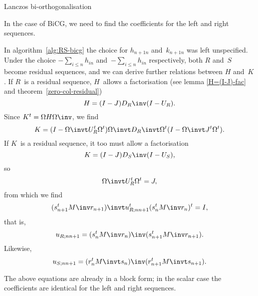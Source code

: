 \documentclass[11pt]{artikel3}
\begin{document}
\begin{Outline}
\begin{comment}
\begin{comment}
\begin{eqnarray*}
S^tP(I- U)=S^tM\inv R&\Rightarrow&
    \hbox{$S^tP$ is upper triangular}\\
    &\hbox{and}&s_i^tp_i=s_i^tM\inv r_i
    \end{eqnarray*}
Using the fact that $S^tP$ is upper triangular we find:
\begin{eqnarray*}
P^tA^tQ D=P^tS(I-J)&\Rightarrow&
    \hbox{$P^tA^tQ$ is lower triangular}\\
    &\Rightarrow&p_i^tA^tq_j=0\quad\hbox{for}\quad
                \begin{cases}i<j&in general\cr i\not=j&symmetric case.\end{cases}
\end{eqnarray*}
\end{comment}

 {Lanczos bi-orthogonalisation}

In the case of BiCG, we need to find the coefficients
for the left and right sequences. 

In algorithm~\ref{alg:RS-bicg} the choice for $h_{n+1n}$ and~$k_{n+1n}$
was left unspecified.
Under the choice $-\sum_{i\leq n}h_{in}$ and~$-\sum_{i\leq n}h_{in}$
respectively,
both $R$ and~$S$ become residual sequences, and we can derive further
relations between $H$ and~$K$.
If $R$~is a residual sequence, $H$~allows a factorisation
(see lemma \ref{H=(I-J)-fac} and theorem~\ref{zero-col-residual})
\[ H=(I-J)D_R\inv(I-U_R). \]
Since $K^t=\Omega H\Omega\inv$, we find
\[ K=(I-\Omega\invt U_R^t\Omega^t)\Omega\invt D_R\invt \Omega^t
                (I-\Omega\invt J^t\Omega^t). \]
If $K$~is a residual sequence, it too must allow a factorisation
\[ K=(I-J)D_S\inv(I-U_S), \]
so
\[ \Omega\invt U_R^t\Omega^t=J, \]
from which we find
\[ (s_{n+1}^tM\inv r_{n+1})\invt u^t_{R;nn+1}(s_n^tM\inv r_n)^t=I, \]
that is,
\begin{equation}
 u_{R;nn+1} = (s_n^tM\inv r_n)\inv(s_{n+1}^tM\inv r_{n+1}).
    \label{eq:u-right}\end{equation}
Likewise,
\begin{equation}
 u_{S;nn+1} = (r_n^tM\invt s_n)\inv(r_{n+1}^tM\invt s_{n+1}).
    \label{eq:u-left}\end{equation}
\begin{block}
The above equations are already in a block form;
in the scalar case the coefficients are identical
for the left and right sequences.
\end{block}


\end{Outline}
\end{document}
